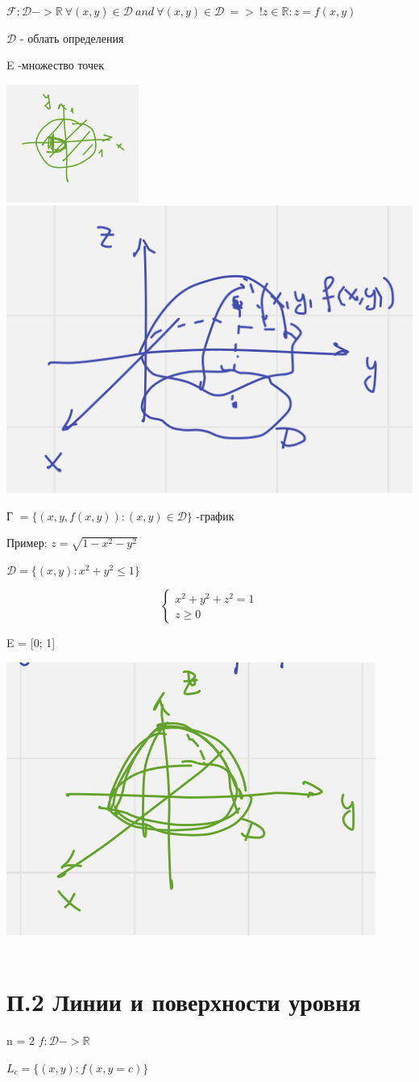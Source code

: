 \documentclass{article}
\begin{document}
$\mathcal{F}: \mathcal{D} -> \mathbb{R}\ \forall(x, y) \in \mathcal{D}\ and \ \forall(x, y)\in \mathcal{D}\ =>\ !z \in \mathbb{R}: z = f(x,y)$

$\mathcal{D}$ - облать определения

E -множество точек

\includegraphics[width=.3\textwidth]{ddd} 
\includegraphics[width=.3\textwidth]{2} 


Г $= \{(x, y, f(x,y)): (x, y) \in \mathcal{D}\}$ -график 

Пример: 
$z = \sqrt{1-x^2-y^2}$

$\mathcal{D} = \{(x, y): x^2 + y ^2 \leq 1\}$


\begin{equation*}
    \begin{cases}
        x^2+y^2+z^2 = 1\\
        z \geq 0
    \end{cases}
\end{equation*}

E = [0; 1]

\includegraphics[width=.3\textwidth]{3} 
\\ \\
\section{П.2 Линии и поверхности уровня}

n = 2 $f: \mathcal{D} -> \mathbb{R}$

$L_c = \{(x, y): f(x, y = c )\}$
\end{document}
